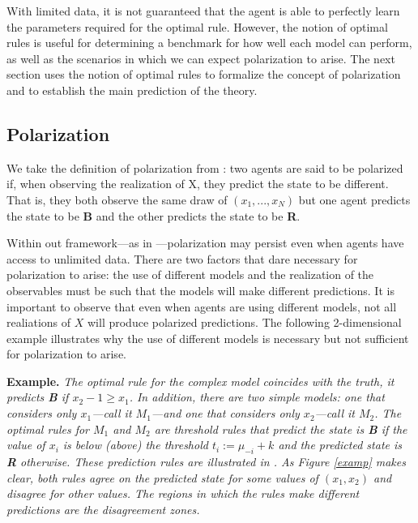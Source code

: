 \documentclass[
  12pt,
]{article}
\begin{document}
With limited data, it is not guaranteed that the agent is able to
perfectly learn the parameters required for the optimal rule. However,
the notion of optimal rules is useful for determining a benchmark for
how well each model can perform, as well as the scenarios in which we
can expect polarization to arise. The next section uses the notion of
optimal rules to formalize the concept of polarization and to establish
the main prediction of the theory.

\hypertarget{polarization}{%
\subsection{Polarization}\label{polarization}}

We take the definition of polarization from \citet{Haghtalab2021}: two
agents are said to be polarized if, when observing the realization of X,
they predict the state to be different. That is, they both observe the
same draw of \((x_1, ..., x_N)\) but one agent predicts the state to be
\textbf{B} and the other predicts the state to be \textbf{R}.

Within out framework---as in \citet{Haghtalab2021}---polarization may
persist even when agents have access to unlimited data. There are two
factors that dare necessary for polarization to arise: the use of
different models and the realization of the observables must be such
that the models will make different predictions. It is important to
observe that even when agents are using different models, not all
realiations of \(X\) will produce polarized predictions. The following
2-dimensional example illustrates why the use of different models is
necessary but not sufficient for polarization to arise.

\textbf{Example.} \emph{The optimal rule for the complex model coincides
with the truth, it predicts \textbf{B} if \(x_2-1\geq x_1\). In
addition, there are two simple models: one that considers only
\(x_1\)---call it \(M_1\)---and one that considers only \(x_2\)---call
it \(M_2\). The optimal rules for \(M_1\) and \(M_2\) are threshold
rules that predict the state is \textbf{B} if the value of \(x_i\) is
below (above) the threshold \(t_i := \mu_{-i} + k\) and the predicted
state is \textbf{R} otherwise. These prediction rules are illustrated in
. As Figure \ref{examp} makes clear, both rules agree on the predicted
state for some values of \((x_1, x_2)\) and disagree for other values.
The regions in which the rules make different predictions are the
disagreement zones.}
\end{document}
